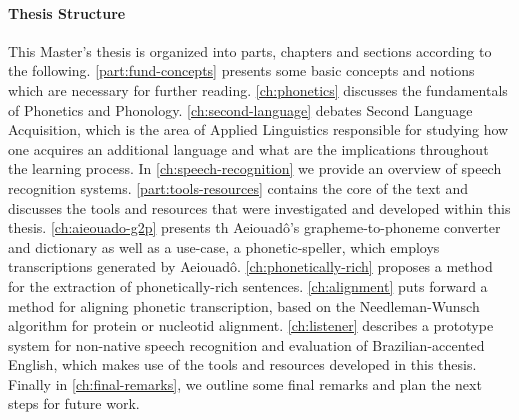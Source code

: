 \paragraph{Thesis Structure}

This Master's thesis is organized into parts, chapters and sections according to the following.
\autoref{part:fund-concepts} presents some basic concepts and notions which are necessary for further reading. \autoref{ch:phonetics} discusses the fundamentals of Phonetics and Phonology. \autoref{ch:second-language} debates Second Language Acquisition, which is the area of Applied Linguistics responsible for studying how one acquires an additional language and what are the implications throughout the learning process. In \autoref{ch:speech-recognition} we provide an overview of speech recognition systems. \autoref{part:tools-resources} contains the core of the text and discusses the tools and resources that were investigated and developed within this thesis. \autoref{ch:aieouado-g2p} presents th Aeiouad\^o's grapheme-to-phoneme converter and dictionary as well as a use-case, a phonetic-speller, which employs transcriptions generated by Aeiouad\^o. \autoref{ch:phonetically-rich} proposes a method for the extraction of phonetically-rich sentences. \autoref{ch:alignment} puts forward a method for aligning phonetic transcription, based on the Needleman-Wunsch algorithm for protein or nucleotid alignment. \autoref{ch:listener} describes a prototype system for non-native speech recognition and evaluation of Brazilian-accented English, which makes use of the tools and resources developed in this thesis. Finally in \autoref{ch:final-remarks}, we outline some final remarks and plan the next steps for future work.